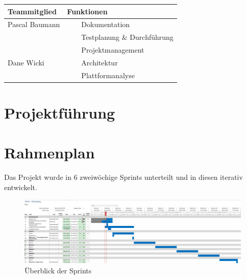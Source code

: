 \documentclass[a4paper]{scrreprt}
\newcommand{\tabitem}{~~\llap{\textbullet}~~}
\begin{document}
\vspace{1em}

\begin{tabularx}{\textwidth}{|X|X|}
	\hline
	\textbf{Teammitglied} & \textbf{Funktionen} \\
	\hline
	Pascal Baumann & \tabitem Dokumentation \\
	& \tabitem Testplanung \& Durchführung \\
	& \tabitem Projektmanagement \\
	\hline
	Dane Wicki & \tabitem Architektur \\
	& \tabitem Plattformanalyse \\
	\hline
\end{tabularx}

\newpage
\section{Projektführung}

\section{Rahmenplan}

Das Projekt wurde in 6 zweiwöchige Sprints unterteilt und in diesen iterativ entwickelt.

\vspace{1em}

\begin{figure}[h!]
	\includegraphics[keepaspectratio, width=\textwidth]{Rahmenplan}
	\caption{Überblick der Sprints}
\end{figure}
\end{document}
